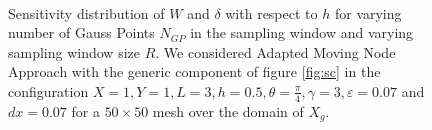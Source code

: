 \begin{figure}[ht]
\centering
{}%
    \\
    \caption{Sensitivity distribution of $W$ and $\delta$ with respect to $h$ for varying number of Gauss Points $N_{GP}$ in the sampling window and varying sampling window size $R$. We considered Adapted Moving Node Approach with the generic component of figure \ref{fig:sc} in the configuration  $X=1,Y=1,L=3,h=0.5,\theta=\frac{\pi}{4}, \gamma=3, \varepsilon=0.07$ and  $dx=0.07$ for a $50\times50$ mesh over the domain of $X_g$.}%
    \label{fig:sensh}%
\end{figure}
